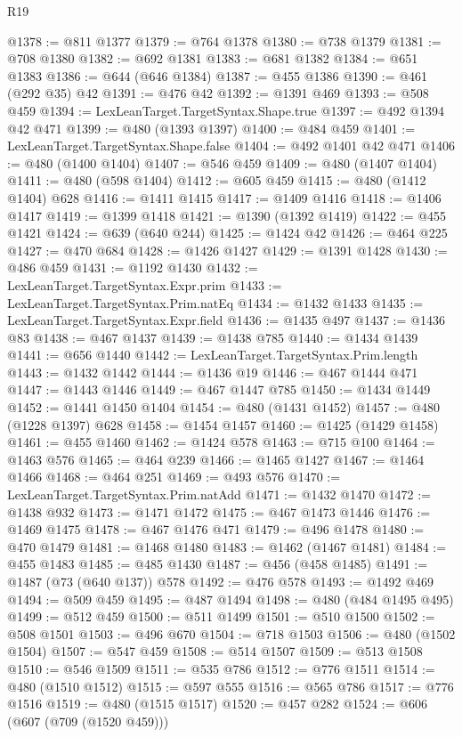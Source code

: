 \begin{lexlean}{R19}
\begin{coremodule}
@1378 := @811 @1377
@1379 := @764 @1378
@1380 := @738 @1379
@1381 := @708 @1380
@1382 := @692 @1381
@1383 := @681 @1382
@1384 := @651 @1383
@1386 := @644 (@646 @1384)
@1387 := @455 @1386
@1390 := @461 (@292 @35) @42
@1391 := @476 @42
@1392 := @1391 @469
@1393 := @508 @459
@1394 := LexLeanTarget.TargetSyntax.Shape.true
@1397 := @492 @1394 @42 @471
@1399 := @480 (@1393 @1397)
@1400 := @484 @459
@1401 := LexLeanTarget.TargetSyntax.Shape.false
@1404 := @492 @1401 @42 @471
@1406 := @480 (@1400 @1404)
@1407 := @546 @459
@1409 := @480 (@1407 @1404)
@1411 := @480 (@598 @1404)
@1412 := @605 @459
@1415 := @480 (@1412 @1404) @628
@1416 := @1411 @1415
@1417 := @1409 @1416
@1418 := @1406 @1417
@1419 := @1399 @1418
@1421 := @1390 (@1392 @1419)
@1422 := @455 @1421
@1424 := @639 (@640 @244)
@1425 := @1424 @42
@1426 := @464 @225
@1427 := @470 @684
@1428 := @1426 @1427
@1429 := @1391 @1428
@1430 := @486 @459
@1431 := @1192 @1430
@1432 := LexLeanTarget.TargetSyntax.Expr.prim
@1433 := LexLeanTarget.TargetSyntax.Prim.natEq
@1434 := @1432 @1433
@1435 := LexLeanTarget.TargetSyntax.Expr.field
@1436 := @1435 @497
@1437 := @1436 @83
@1438 := @467 @1437
@1439 := @1438 @785
@1440 := @1434 @1439
@1441 := @656 @1440
@1442 := LexLeanTarget.TargetSyntax.Prim.length
@1443 := @1432 @1442
@1444 := @1436 @19
@1446 := @467 @1444 @471
@1447 := @1443 @1446
@1449 := @467 @1447 @785
@1450 := @1434 @1449
@1452 := @1441 @1450 @1404
@1454 := @480 (@1431 @1452)
@1457 := @480 (@1228 @1397) @628
@1458 := @1454 @1457
@1460 := @1425 (@1429 @1458)
@1461 := @455 @1460
@1462 := @1424 @578
@1463 := @715 @100
@1464 := @1463 @576
@1465 := @464 @239
@1466 := @1465 @1427
@1467 := @1464 @1466
@1468 := @464 @251
@1469 := @493 @576
@1470 := LexLeanTarget.TargetSyntax.Prim.natAdd
@1471 := @1432 @1470
@1472 := @1438 @932
@1473 := @1471 @1472
@1475 := @467 @1473 @1446
@1476 := @1469 @1475
@1478 := @467 @1476 @471
@1479 := @496 @1478
@1480 := @470 @1479
@1481 := @1468 @1480
@1483 := @1462 (@1467 @1481)
@1484 := @455 @1483
@1485 := @485 @1430
@1487 := @456 (@458 @1485)
@1491 := @1487 (@73 (@640 @137)) @578
@1492 := @476 @578
@1493 := @1492 @469
@1494 := @509 @459
@1495 := @487 @1494
@1498 := @480 (@484 @1495 @495)
@1499 := @512 @459
@1500 := @511 @1499
@1501 := @510 @1500
@1502 := @508 @1501
@1503 := @496 @670
@1504 := @718 @1503
@1506 := @480 (@1502 @1504)
@1507 := @547 @459
@1508 := @514 @1507
@1509 := @513 @1508
@1510 := @546 @1509
@1511 := @535 @786
@1512 := @776 @1511
@1514 := @480 (@1510 @1512)
@1515 := @597 @555
@1516 := @565 @786
@1517 := @776 @1516
@1519 := @480 (@1515 @1517)
@1520 := @457 @282
@1524 := @606 (@607 (@709 (@1520 @459)))

\end{coremodule}
\end{lexlean}
